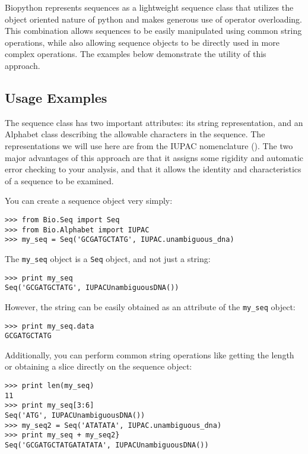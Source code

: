 \documentclass[dvips]{article}
\begin{document}
Biopython represents sequences as a lightweight sequence class that utilizes the object oriented nature of python and makes generous use of operator overloading. This combination allows sequences to be easily manipulated using common string operations, while also allowing sequence objects to be directly used in more complex operations. The examples below demonstrate the utility of this approach.


\subsection{Usage Examples}

The sequence class has two important attributes: its string representation, and an Alphabet class describing the allowable characters in the sequence.  The representations we will use here are from the IUPAC nomenclature (). The two major advantages of this approach are that it assigns some rigidity and automatic error checking to your analysis, and that it allows the identity and characteristics of a sequence to be examined.


You can create a sequence object very simply:

\begin{verbatim}
>>> from Bio.Seq import Seq
>>> from Bio.Alphabet import IUPAC
>>> my_seq = Seq('GCGATGCTATG', IUPAC.unambiguous_dna)
\end{verbatim}

The \verb|my_seq| object is a \verb|Seq| object, and not just a string:

\begin{verbatim}
>>> print my_seq
Seq('GCGATGCTATG', IUPACUnambiguousDNA())
\end{verbatim}

However, the string can be easily obtained as an attribute of the \verb|my_seq| object:

\begin{verbatim}
>>> print my_seq.data
GCGATGCTATG
\end{verbatim}

Additionally, you can perform common string operations like getting the length or obtaining a slice directly on the sequence object:

\begin{verbatim}
>>> print len(my_seq)
11
>>> print my_seq[3:6]
Seq('ATG', IUPACUnambiguousDNA())
>>> my_seq2 = Seq('ATATATA', IUPAC.unambiguous_dna)
>>> print my_seq + my_seq2}
Seq('GCGATGCTATGATATATA', IUPACUnambiguousDNA())
\end{verbatim}
\end{document}
